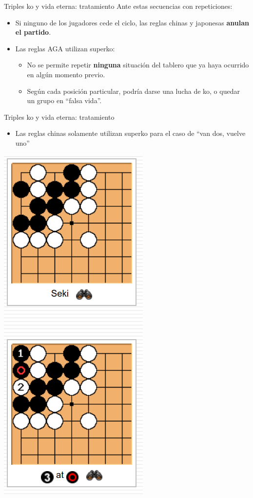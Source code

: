 \documentclass{beamer}
\begin{document}
\begin{frame}{Triples ko y vida eterna: tratamiento}
    Ante estas secuencias con repeticiones:
    
    \begin{itemize}
        \item Si ninguno de los jugadores cede el ciclo, las reglas chinas y japonesas \textbf{anulan el partido}.
        \item Las reglas AGA utilizan superko:
        \begin{itemize}
          \item No se permite repetir \textbf{ninguna} situación del tablero que ya haya ocurrido en algún momento previo.
          \item Según cada posición particular, podría darse una lucha de ko, o quedar un grupo en ``falsa vida''.
        \end{itemize}
        
    \end{itemize}
\end{frame}



\begin{frame}{Triples ko y vida eterna: tratamiento}
    \begin{itemize}
        \item Las reglas chinas solamente utilizan superko para el caso de ``van dos, vuelve uno''
    \end{itemize}
    
\includegraphics[scale=0.2]{sending2.png}
\end{frame}
\end{document}
